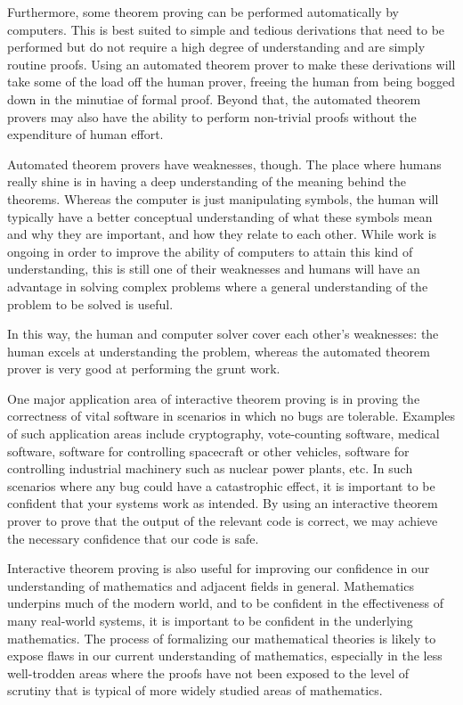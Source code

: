 \documentclass{article}
\begin{document}
Furthermore, some theorem proving can be performed automatically by computers. This is best suited to simple and tedious derivations that need to be performed but do not require a high degree of understanding and are simply routine proofs. Using an automated theorem prover to make these derivations will take some of the load off the human prover, freeing the human from being bogged down in the minutiae of formal proof. Beyond that, the automated theorem provers may also have the ability to perform non-trivial proofs without the expenditure of human effort.

Automated theorem provers have weaknesses, though. The place where humans really shine is in having a deep understanding of the meaning behind the theorems. Whereas the computer is just manipulating symbols, the human will typically have a better conceptual understanding of what these symbols mean and why they are important, and how they relate to each other. While work is ongoing in order to improve the ability of computers to attain this kind of understanding, this is still one of their weaknesses and humans will have an advantage in solving complex problems where a general understanding of the problem to be solved is useful.

In this way, the human and computer solver cover each other’s weaknesses: the human excels at understanding the problem, whereas the automated theorem prover is very good at performing the grunt work.

One major application area of interactive theorem proving is in proving the correctness of vital software in scenarios in which no bugs are tolerable. Examples of such application areas include cryptography, vote-counting software, medical software, software for controlling spacecraft or other vehicles, software for controlling industrial machinery such as nuclear power plants, etc. In such scenarios where any bug could have a catastrophic effect, it is important to be confident that your systems work as intended. By using an interactive theorem prover to prove that the output of the relevant code is correct, we may achieve the necessary confidence that our code is safe.

Interactive theorem proving is also useful for improving our confidence in our understanding of mathematics and adjacent fields in general. Mathematics underpins much of the modern world, and to be confident in the effectiveness of many real-world systems, it is important to be confident in the underlying mathematics. The process of formalizing our mathematical theories is likely to expose flaws in our current understanding of mathematics, especially in the less well-trodden areas where the proofs have not been exposed to the level of scrutiny that is typical of more widely studied areas of mathematics.
\end{document}

